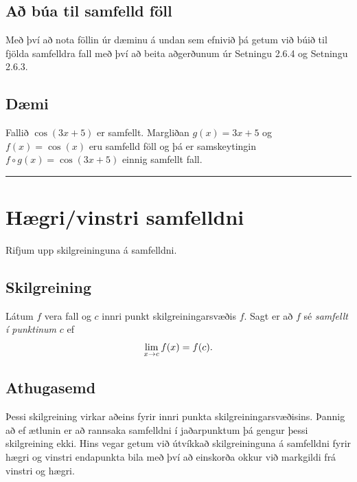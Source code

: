 \documentclass[b5paper,10pt,icelandic]{sphinxmanual}
\begin{document}
\subsection{Að búa til samfelld föll}
\label{kafli02:a-bua-til-samfelld-foll}
Með því að nota föllin úr dæminu á undan sem efnivið þá getum við búið
til fjölda samfelldra fall með því að beita aðgerðunum úr Setningu 2.6.4
og Setningu 2.6.3.


\subsection{Dæmi}
\label{kafli02:id14}\label{kafli02:index-10}
Fallið \(\cos(3x+5)\) er samfellt. Margliðan \(g(x) =3x+5\) og
\(f(x) = \cos(x)\) eru samfelld föll og þá er samskeytingin
\(f\circ g(x) = \cos(3x+5)\) einnig samfellt fall.


\bigskip\hrule{}\bigskip



\section{Hægri/vinstri samfelldni}
\label{kafli02:haegri-vinstri-samfelldni}
Rifjum upp skilgreininguna á samfelldni.


\subsection{Skilgreining}
\label{kafli02:skilgreining}
Látum \(f\) vera fall og \(c\) innri punkt skilgreiningarsvæðis
\(f\). Sagt er að \(f\) sé \emph{samfellt í punktinum} \(c\) ef
\begin{gather}
\begin{split}\lim_{x\rightarrow c}f(x)=f(c).\end{split}\notag
\end{gather}

\subsection{Athugasemd}
\label{kafli02:athugasemd}
Þessi skilgreining virkar aðeins fyrir innri punkta
skilgreiningarsvæðisins. Þannig að ef ætlunin er að rannsaka samfelldni
í jaðarpunktum þá gengur þessi skilgreining ekki. Hins vegar getum við
útvíkkað skilgreininguna á samfelldni fyrir hægri og vinstri endapunkta
bila með því að einskorða okkur við markgildi frá vinstri og hægri.
\end{document}
